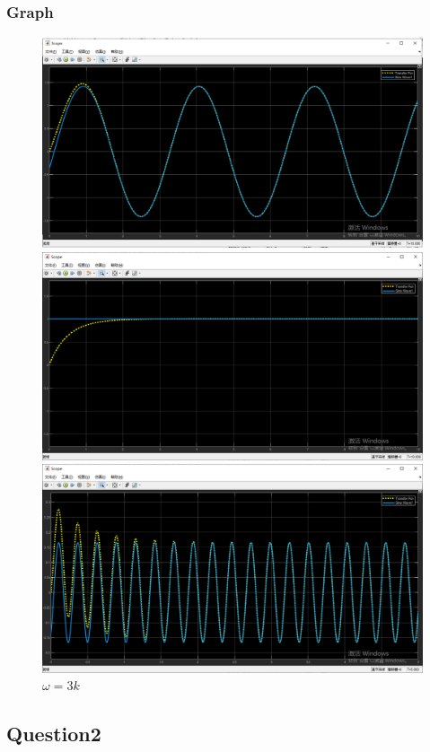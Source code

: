 \documentclass[12pt,a4paper,oneside]{ctexart}
\begin{document}
        \subsubsection{Graph}
            \begin{figure}[H]
                \includegraphics[width = 0.9\linewidth]{Q1Omega_eq2}
                \caption{ $\omega = 2 $}
                \includegraphics[width = 0.9\linewidth]{Q1Omega_eq0}
                \caption{ $\omega = 0 $}
                \includegraphics[width = 0.9\linewidth]{Q1Omega_eq3k}
                \caption{ $\omega = 3k $ }
            \end{figure}
    \subsection{Question2}
\end{document}
